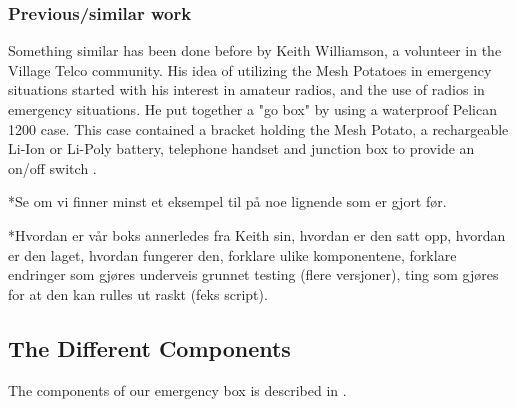 \subsubsection{Previous/similar work}
Something similar has been done before by Keith Williamson, a volunteer in the Village Telco community. His idea of utilizing the Mesh Potatoes in emergency situations started with his interest in amateur radios, and the use of radios in emergency situations. He put together a "go box" by using a waterproof Pelican 1200 case. This case contained a bracket holding the Mesh Potato, a rechargeable Li-Ion or Li-Poly battery, telephone handset and junction box to provide an on/off switch \cite{keith}. 

*Se om vi finner minst et eksempel til på noe lignende som er gjort før. 

*Hvordan er vår boks annerledes fra Keith sin, hvordan er den satt opp, hvordan er den laget, hvordan fungerer den, forklare ulike komponentene, forklare endringer som gjøres underveis grunnet testing (flere versjoner), ting som gjøres for at den kan rulles ut raskt (feks script). 

\subsection{The Different Components}
The components of our emergency box is described in . 

